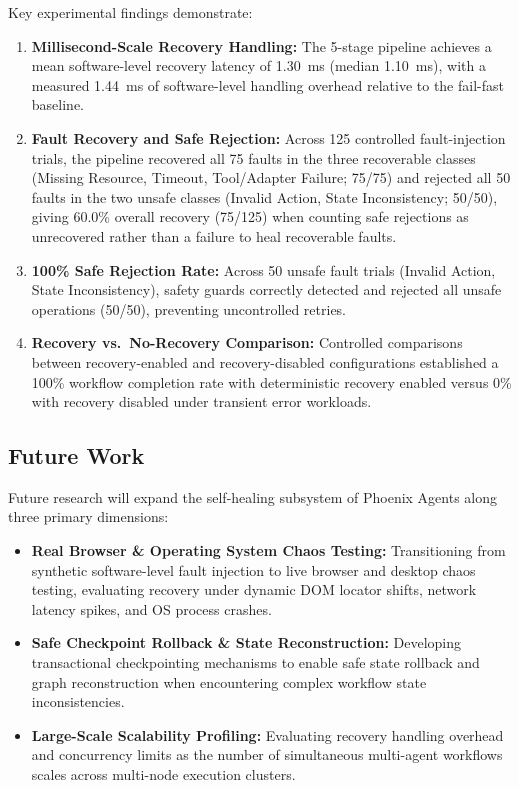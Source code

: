 \documentclass[conference]{IEEEtran}
\begin{document}
Key experimental findings demonstrate:
\begin{enumerate}
    \item \textbf{Millisecond-Scale Recovery Handling:} The 5-stage pipeline achieves a mean software-level recovery latency of 1.30~ms (median 1.10~ms), with a measured 1.44~ms of software-level handling overhead relative to the fail-fast baseline.
    \item \textbf{Fault Recovery and Safe Rejection:} Across 125 controlled fault-injection trials, the pipeline recovered all 75 faults in the three recoverable classes (Missing Resource, Timeout, Tool/Adapter Failure; 75/75) and rejected all 50 faults in the two unsafe classes (Invalid Action, State Inconsistency; 50/50), giving 60.0\% overall recovery (75/125) when counting safe rejections as unrecovered rather than a failure to heal recoverable faults.
    \item \textbf{100\% Safe Rejection Rate:} Across 50 unsafe fault trials (Invalid Action, State Inconsistency), safety guards correctly detected and rejected all unsafe operations (50/50), preventing uncontrolled retries.
    \item \textbf{Recovery vs.\ No-Recovery Comparison:} Controlled comparisons between recovery-enabled and recovery-disabled configurations established a 100\% workflow completion rate with deterministic recovery enabled versus 0\% with recovery disabled under transient error workloads.
\end{enumerate}

\subsection{Future Work}
Future research will expand the self-healing subsystem of Phoenix Agents along three primary dimensions:
\begin{itemize}
    \item \textbf{Real Browser \& Operating System Chaos Testing:} Transitioning from synthetic software-level fault injection to live browser and desktop chaos testing, evaluating recovery under dynamic DOM locator shifts, network latency spikes, and OS process crashes.
    \item \textbf{Safe Checkpoint Rollback \& State Reconstruction:} Developing transactional checkpointing mechanisms to enable safe state rollback and graph reconstruction when encountering complex workflow state inconsistencies.
    \item \textbf{Large-Scale Scalability Profiling:} Evaluating recovery handling overhead and concurrency limits as the number of simultaneous multi-agent workflows scales across multi-node execution clusters.
\end{itemize}
\end{document}
